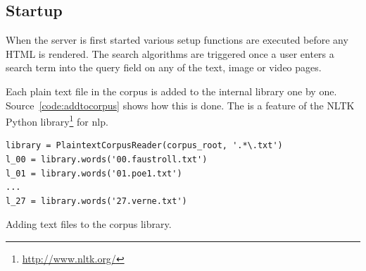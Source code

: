 

\subsection{Startup}
\label{s:index}

When the server is first started various setup functions are executed before any HTML is rendered. The search algorithms are triggered once a user enters a search term into the query field on any of the text, image or video pages.

Each plain text file in the corpus is added to the internal library one by one. Source~\ref{code:addtocorpus} shows how this is done. The  is a feature of the \ac{NLTK} Python library\footnote{\url{http://www.nltk.org/}} for \acl{nlp}.

\begin{listing}
  \begin{verbatim}
library = PlaintextCorpusReader(corpus_root, '.*\.txt')
l_00 = library.words('00.faustroll.txt')
l_01 = library.words('01.poe1.txt')
...
l_27 = library.words('27.verne.txt')
  \end{verbatim}
\caption{Adding text files to the corpus library.}
\label{code:addtocorpus}
\end{listing}

